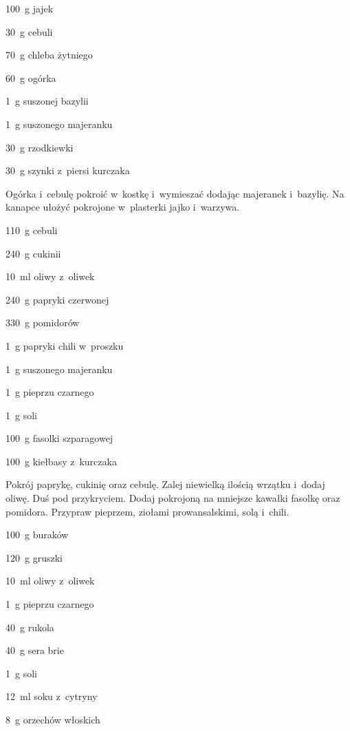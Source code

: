 \documentclass[../kucharek.tex]{subfiles}
\begin{document}

\begin{Ingred}
    \item \qty{100}{\gram} jajek
    \item \qty{30}{\gram} cebuli
    \item \qty{70}{\gram} chleba żytniego
    \item \qty{60}{\gram} ogórka
    \item \qty{1}{\gram} suszonej bazylii
    \item \qty{1}{\gram} suszonego majeranku
    \item \qty{30}{\gram} rzodkiewki
    \item \qty{30}{\gram} szynki z~piersi kurczaka
\end{Ingred}

Ogórka i~cebulę pokroić w~kostkę i~wymieszać dodając majeranek i~bazylię. Na
kanapce ułożyć pokrojone w~plasterki jajko i~warzywa.


\begin{Ingred}
    \item \qty{110}{\gram} cebuli
    \item \qty{240}{\gram} cukinii
    \item \qty{10}{\milli\litre} oliwy z~oliwek
    \item \qty{240}{\gram} papryki czerwonej
    \item \qty{330}{\gram} pomidorów
    \item \qty{1}{\gram} papryki chili w~proszku
    \item \qty{1}{\gram} suszonego majeranku
    \item \qty{1}{\gram} pieprzu czarnego
    \item \qty{1}{\gram} soli
    \item \qty{100}{\gram} fasolki szparagowej
    \item \qty{100}{\gram} kiełbasy z~kurczaka
\end{Ingred}

Pokrój paprykę, cukinię oraz cebulę. Zalej niewielką ilością wrzątku i~dodaj
oliwę. Duś pod przykryciem. Dodaj pokrojoną na mniejsze kawałki fasolkę oraz
pomidora. Przypraw pieprzem, ziołami prowansalskimi, solą i~chili.


\begin{Ingred}
    \item \qty{100}{\gram} buraków
    \item \qty{120}{\gram} gruszki
    \item \qty{10}{\milli\litre} oliwy z~oliwek
    \item \qty{1}{\gram} pieprzu czarnego
    \item \qty{40}{\gram} rukola
    \item \qty{40}{\gram} sera brie
    \item \qty{1}{\gram} soli
    \item \qty{12}{\milli\litre} soku z~cytryny
    \item \qty{8}{\gram} orzechów włoskich
\end{Ingred}
\end{document}
